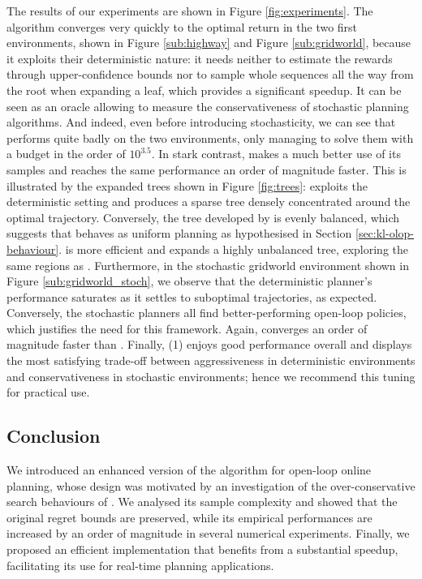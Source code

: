 The results of our experiments are shown in Figure \ref{fig:experiments}. The \OPD algorithm converges very quickly to the optimal return in the two first environments, shown in Figure \ref{sub:highway} and Figure \ref{sub:gridworld}, because it exploits their deterministic nature: it needs neither to estimate the rewards through upper-confidence bounds nor to sample whole sequences all the way from the root when expanding a leaf, which provides a significant speedup. It can be seen as an oracle allowing to measure the conservativeness of stochastic planning algorithms. And indeed, even before introducing stochasticity, we can see that \OLOP performs quite badly on the two environments, only managing to solve them with a budget in the order of $10^{3.5}$. In stark contrast, \KLOLOP makes a much better use of its samples and reaches the same performance an order of magnitude faster. This is illustrated by the expanded trees shown in Figure \ref{fig:trees}: \OPD exploits the deterministic setting and produces a sparse tree densely concentrated around the optimal trajectory. Conversely, the tree developed by \OLOP is evenly balanced, which suggests that \OLOP behaves as uniform planning as hypothesised in Section \ref{sec:kl-olop-behaviour}. \KLOLOP is more efficient and expands a highly unbalanced tree, exploring the same regions as \OPD. Furthermore, in the stochastic gridworld environment shown in Figure \ref{sub:gridworld_stoch}, we observe that the deterministic \OPD planner's performance saturates as it settles to suboptimal trajectories, as expected. Conversely, the stochastic planners all find better-performing open-loop policies, which justifies the need for this framework. Again, \KLOLOP converges an order of magnitude faster than \OLOP. Finally, \KLOLOP(1) enjoys good performance overall and displays the most satisfying trade-off between aggressiveness in deterministic environments and conservativeness in stochastic environments; hence we recommend this tuning for practical use.

\subsection{Conclusion}

We introduced an enhanced version of the \OLOP algorithm for open-loop online planning, whose design was motivated by an investigation of the over-conservative search behaviours of \OLOP. We analysed its sample complexity and showed that the original regret bounds are preserved, while its empirical performances are increased by an order of magnitude in several numerical experiments. Finally, we proposed an efficient implementation that benefits from a substantial speedup, facilitating its use for real-time planning applications.



